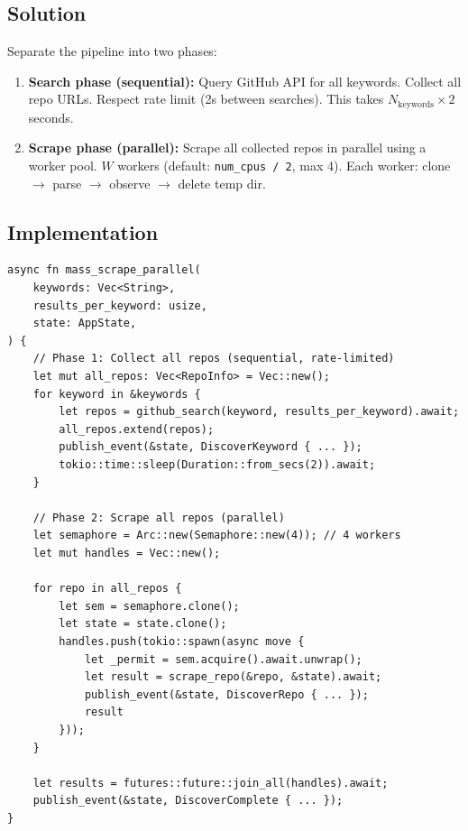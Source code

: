 \documentclass[11pt,a4paper]{article}
\begin{document}
\subsection{Solution}

Separate the pipeline into two phases:

\begin{enumerate}[nosep]
\item \textbf{Search phase (sequential):} Query GitHub API for 
      all keywords. Collect all repo URLs. Respect rate limit 
      (2s between searches). This takes $N_\text{keywords} \times 2$ 
      seconds.
\item \textbf{Scrape phase (parallel):} Scrape all collected repos 
      in parallel using a worker pool. $W$ workers (default: 
      \texttt{num\_cpus / 2}, max 4). Each worker: clone $\to$ 
      parse $\to$ observe $\to$ delete temp dir.
\end{enumerate}

\subsection{Implementation}

\begin{lstlisting}[style=rust]
async fn mass_scrape_parallel(
    keywords: Vec<String>,
    results_per_keyword: usize,
    state: AppState,
) {
    // Phase 1: Collect all repos (sequential, rate-limited)
    let mut all_repos: Vec<RepoInfo> = Vec::new();
    for keyword in &keywords {
        let repos = github_search(keyword, results_per_keyword).await;
        all_repos.extend(repos);
        publish_event(&state, DiscoverKeyword { ... });
        tokio::time::sleep(Duration::from_secs(2)).await;
    }
    
    // Phase 2: Scrape all repos (parallel)
    let semaphore = Arc::new(Semaphore::new(4)); // 4 workers
    let mut handles = Vec::new();
    
    for repo in all_repos {
        let sem = semaphore.clone();
        let state = state.clone();
        handles.push(tokio::spawn(async move {
            let _permit = sem.acquire().await.unwrap();
            let result = scrape_repo(&repo, &state).await;
            publish_event(&state, DiscoverRepo { ... });
            result
        }));
    }
    
    let results = futures::future::join_all(handles).await;
    publish_event(&state, DiscoverComplete { ... });
}
\end{lstlisting}
\end{document}
